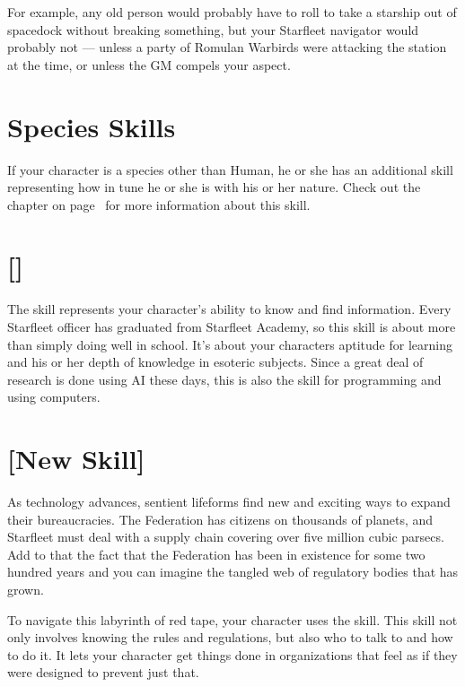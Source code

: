 \documentclass[12pt,titlepage,openany]{book}
\begin{document}
For example, any old person would probably have to roll  to take a
 starship out of spacedock without breaking something, but
your Starfleet navigator would probably not --- unless a party of Romulan
Warbirds were attacking the station at the time, or unless the GM compels your
 aspect.

\section{Species Skills}\label{sec:species-skills}

If your character is a species other than Human, he or she has an additional
skill representing how in tune he or she is with his or her nature. Check out
the chapter  on page~\pageref{chap:species} for more
information about this skill.

\section{ []}\label{sec:academics}

The  skill represents your character's ability to know and
find information. Every Starfleet officer has graduated from Starfleet Academy,
so this skill is about more than simply doing well in school. It's about your
characters aptitude for learning and his or her depth of knowledge in esoteric
subjects. Since a great deal of research is done using AI these days, this is
also the skill for programming and using computers.

\section{ [New Skill]}\label{sec:bureaucracy}

As technology advances, sentient lifeforms find new and exciting ways to expand
their bureaucracies. The Federation has citizens on thousands of planets, and
Starfleet must deal with a supply chain covering over five million cubic
parsecs. Add to that the fact that the Federation has been in existence for
some two hundred years and you can imagine the tangled web of regulatory bodies
that has grown.

To navigate this labyrinth of red tape, your character uses the
 skill. This skill not only involves knowing the rules and
regulations, but also who to talk to and how to do it. It lets your character
get things done in organizations that feel as if they were designed to prevent
just that.
\end{document}
